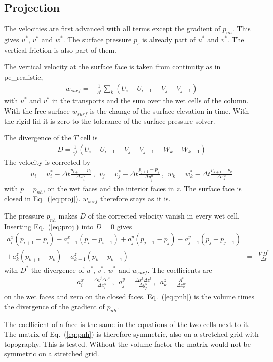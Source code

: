 \documentclass[12pt]{article}
\newcommand{\beq}  { \begin{eqnarray} }
\newcommand{\eeq}  { \end{eqnarray}}
\newcommand{\eq }  [1]{Eq.~(\ref{#1})}  %
\newcommand{\lk}{\left(}
\newcommand{\rk}{\right)}
\begin{document}
\subsection*{Projection}

The velocities are first advanced with all terms except the gradient of $p_{nh}$.
This gives $u^*$, $v^*$ and $w^*$.
The surface pressure $p_s$ is already part of $u^*$ and $v^*$.
The vertical friction is also part of them.

The vertical velocity at the surface face is taken from continuity as in pe\_realistic,
\beq \label{eq:wsurf}
 w_{surf} = - \frac{1}{A^t} \sum_k \lk U_i - U_{i-1} + V_j - V_{j-1} \rk
\eeq
with $u^*$ and $v^*$ in the transports and the sum over the wet cells of the column.
With the free surface $w_{surf}$ is the change of the surface elevation in time.
With the rigid lid it is zero to the tolerance of the surface pressure solver.

The divergence of the $T$ cell is
\beq
 D = \frac{1}{V^t} \lk U_i - U_{i-1} + V_j - V_{j-1} + W_k - W_{k-1} \rk
\eeq
The velocity is corrected by
\beq \label{eq:proj}
 u_i = u^*_i - \Delta t \frac{p_{i+1} - p_i}{\Delta x^u_i} ~,~~
 v_j = v^*_j - \Delta t \frac{p_{j+1} - p_j}{\Delta y^u_j} ~,~~
 w_k = w^*_k - \Delta t \frac{p_{k+1} - p_k}{\Delta z^w_k}
\eeq
with $p = p_{nh}$, on the wet faces and the interior faces in $z$.
The surface face is closed in \eq{eq:proj}.
$w_{surf}$ therefore stays as it is.

The pressure $p_{nh}$ makes $D$ of the corrected velocity vanish in every wet cell.
Inserting \eq{eq:proj} into $D = 0$ gives
\beq \label{eq:pnh}
 a^x_i \lk p_{i+1} - p_i \rk - a^x_{i-1} \lk p_i - p_{i-1} \rk
 + a^y_j \lk p_{j+1} - p_j \rk - a^y_{j-1} \lk p_j - p_{j-1} \rk && \nonumber \\
 + a^z_k \lk p_{k+1} - p_k \rk - a^z_{k-1} \lk p_k - p_{k-1} \rk
 &=& \frac{V^t D^*}{\Delta t}
\eeq
with $D^*$ the divergence of $u^*$, $v^*$, $w^*$ and $w_{surf}$.
The coefficients are
\beq
 a^x_i = \frac{\Delta y^t \Delta z^t}{\Delta x^u_i} ~,~~
 a^y_j = \frac{\Delta x^t \Delta z^t}{\Delta y^u_j} ~,~~
 a^z_k = \frac{A^t}{\Delta z^w_k}
\eeq
on the wet faces and zero on the closed faces.
\eq{eq:pnh} is the volume times the divergence of the gradient of $p_{nh}$.

The coefficient of a face is the same in the equations of the two cells next to it.
The matrix of \eq{eq:pnh} is therefore symmetric, also on a stretched grid with topography.
This is tested.
Without the volume factor the matrix would not be symmetric on a stretched grid.
\end{document}
